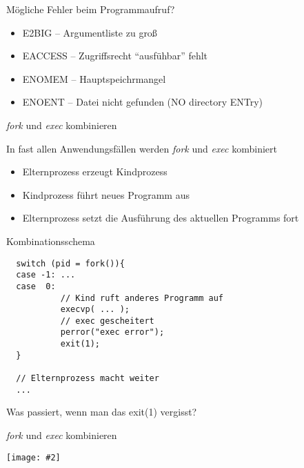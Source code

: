 \documentclass[utf8,9pt]{beamer}
\newcommand{\bild}[2][0.9\textwidth]{\texttt{[image: \#2]}}
\newenvironment{blue}{\color{blue}}{}
\begin{document}
\begin{frame}[fragile]{Mögliche Fehler beim Programmaufruf?}{}


\begin{itemize}[<+(1)->]

\item E2BIG  \pause -- Argumentliste zu groß
\item EACCESS  \pause -- Zugriffsrecht "`ausfühbar"' fehlt
\item ENOMEM \pause -- Hauptspeichrmangel
\item ENOENT \pause -- Datei nicht gefunden (NO directory ENTry)
\end{itemize}

\end{frame}



\begin{frame}[fragile]{{\em fork\/} und {\em exec\/} kombinieren}{}

\begin{block}{In fast allen Anwendungsfällen werden {\em fork\/} und {\em exec\/}
kombiniert}
\begin{itemize}
\item Elternprozess erzeugt Kindprozess
\item Kindprozess führt neues Programm aus
\item Elternprozess setzt die Ausführung des aktuellen Programms fort
\end{itemize}
\end{block}


\begin{block}{Kombinationsschema}
{
\footnotesize
\begin{verbatim}
  switch (pid = fork()){
  case -1: ...
  case  0:
           // Kind ruft anderes Programm auf
           execvp( ... );
           // exec gescheitert
           perror("exec error");
           exit(1);
  }

  // Elternprozess macht weiter
  ...
\end{verbatim}
}
\begin{blue}
Was passiert, wenn man das exit(1) vergisst?
\end{blue}

\end{block}
\end{frame}




\begin{frame}{{\em fork\/} und {\em exec\/} kombinieren}{}

 \bild[0.6\textwidth]{bilder/fork-exec.pdf}

\end{frame}
\end{document}
